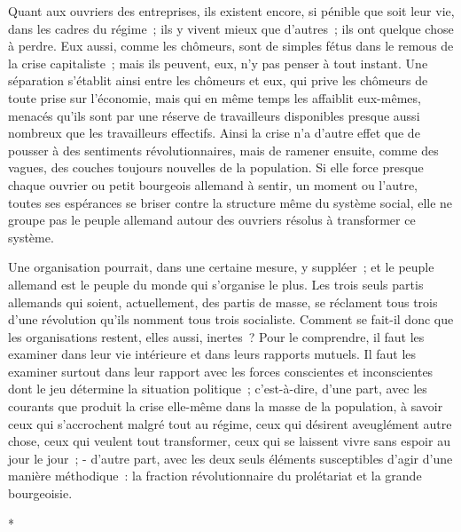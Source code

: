 \documentclass[french,twoside]{book} %
\begin{document}
Quant aux ouvriers des entreprises, ils existent encore, si pénible que soit leur vie, dans les cadres du régime ; ils y vivent mieux que d'autres ; ils ont quelque chose à perdre. Eux aussi, comme les chômeurs, sont de simples fétus dans le remous de la crise capitaliste ; mais ils peuvent, eux, n'y pas penser à tout instant. Une séparation s'établit ainsi entre les chômeurs et eux, qui prive les chômeurs de toute prise sur l'économie, mais qui en même temps les affaiblit eux-mêmes, menacés qu'ils sont par une réserve de travailleurs disponibles presque aussi nombreux que les travailleurs effectifs. Ainsi la crise n'a d'autre effet que de pousser à des sentiments révolutionnaires, mais de ramener ensuite, comme des vagues, des couches toujours nouvelles de la population. Si elle force presque chaque ouvrier ou petit bourgeois allemand à sentir, un moment ou l'autre, toutes ses espérances se briser contre la structure même du système social, elle ne groupe pas le peuple allemand autour des ouvriers résolus à transformer ce système.\par
Une organisation pourrait, dans une certaine mesure, y suppléer ; et le peuple allemand est le peuple du monde qui s'organise le plus. Les trois seuls partis allemands qui soient, actuellement, des partis de masse, se réclament tous trois d'une révolution qu'ils nomment tous trois socialiste. Comment se fait-il donc que les organisations restent, elles aussi, inertes ? Pour le comprendre, il faut les examiner dans leur vie intérieure et dans leurs rapports mutuels. Il faut les examiner surtout dans leur rapport avec les forces con­scientes et inconscientes dont le jeu détermine la situation politique ; c'est-à-dire, d'une part, avec les courants que produit la crise elle-même dans la masse de la population, à savoir ceux qui s'accrochent malgré tout au régime, ceux qui désirent aveuglément autre chose, ceux qui veulent tout transformer, ceux qui se laissent vivre sans espoir au jour le jour ; - d'autre part, avec les deux seuls éléments susceptibles d'agir d'une manière méthodique : la fraction révolutionnaire du prolétariat et la grande bourgeoisie.\par

\begin{center}
\noindent \centerline{*}\par
\end{center}
\end{document}
